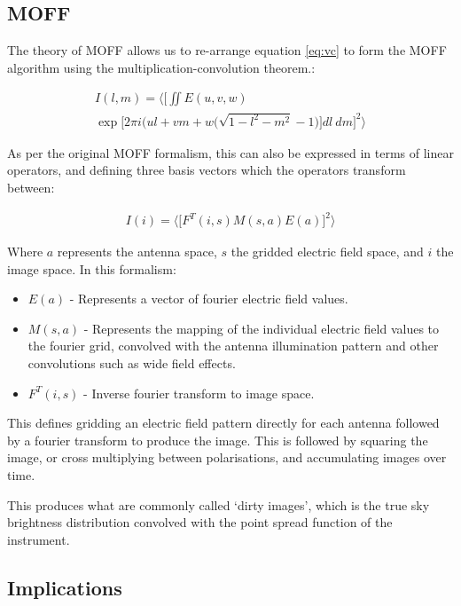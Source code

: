 \documentclass[bibliography=totocnumbered, twocolumn]{article}
\begin{document}
\subsection{MOFF}

The theory of MOFF allows us to re-arrange equation \ref{eq:vc}
to form the MOFF algorithm using the multiplication-convolution
theorem.\cite{morales_enabling_2011}:

\begin{multline} \label{eq:vc}
 I(l,m) = \Bigg\langle \bigg[\iint E(u,v,w) \\ \exp\big[2\pi i \big(ul + vm + w\big(\sqrt{1-l^2-m^2}-1\big)\big]dl\: dm \bigg]^2 \Bigg \rangle
\end{multline}

As per the original MOFF formalism, this can also be expressed
in terms of linear operators, and defining three basis vectors
which the operators transform between:

\begin{align} \label{eq:linformalism}
  I(i) = \Bigg \langle \bigg[ F^T(i,s)M(s,a)E(a)\bigg]^2 \Bigg \rangle
\end{align}

Where $a$ represents the antenna space, $s$ the gridded electric
field space, and $i$ the image space. In this formalism:

\begin{itemize}
  \item $E(a)$ - Represents a vector of fourier electric field values.
  \item $M(s,a)$ - Represents the mapping of the individual electric field values to the fourier grid, convolved with the antenna illumination pattern and other convolutions such as wide field effects.
  \item $F^T(i,s)$ - Inverse fourier transform to image space.
\end{itemize}

This defines gridding an electric field pattern directly for each
antenna followed by a fourier transform to produce the image. This is
followed by squaring the image, or cross multiplying between
polarisations, and accumulating images over time.

This produces what are commonly called `dirty images', which is the
true sky brightness distribution convolved with the point spread
function of the instrument.

\subsection{Implications}
\end{document}
